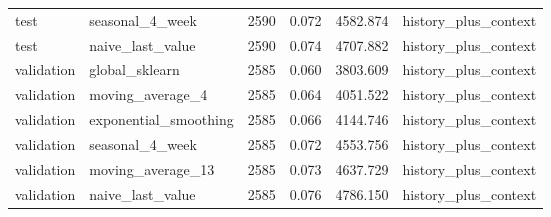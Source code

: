 \begin{table}
{\begin{tabular}{llrrrl}
       test &        seasonal\_4\_week &       2590 & 0.072 & 4582.874 &  history\_plus\_context \\
       test &       naive\_last\_value &       2590 & 0.074 & 4707.882 &  history\_plus\_context \\
 validation &         global\_sklearn &       2585 & 0.060 & 3803.609 &  history\_plus\_context \\
 validation &       moving\_average\_4 &       2585 & 0.064 & 4051.522 &  history\_plus\_context \\
 validation &  exponential\_smoothing &       2585 & 0.066 & 4144.746 &  history\_plus\_context \\
 validation &        seasonal\_4\_week &       2585 & 0.072 & 4553.756 &  history\_plus\_context \\
 validation &      moving\_average\_13 &       2585 & 0.073 & 4637.729 &  history\_plus\_context \\
 validation &       naive\_last\_value &       2585 & 0.076 & 4786.150 &  history\_plus\_context \\
\bottomrule
\end{tabular}
}

\end{table}
